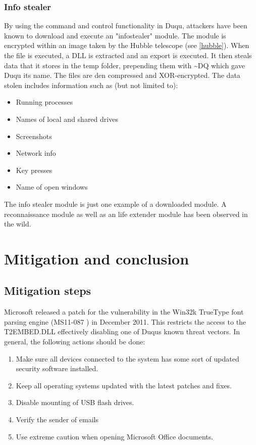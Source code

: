\documentclass[11pt,english,a4paper]{report}
\begin{document}
\subsection{Info stealer}
By using the command and control functionality in Duqu, attackers have been known to download and execute an "infostealer" module. The module is encrypted within an image taken by the Hubble telescope (see \ref{hubble}). When the file is executed, a DLL is extracted and an export is executed. It then steals data that it stores in the temp folder, prepending them with \textasciitilde DQ which gave Duqu its name.
The files are den compressed and XOR-encrypted. The data stolen includes information such as (but not limited to):
\begin{itemize}
  \item Running processes
  \item Names of local and shared drives
  \item Screenshots
  \item Network info
  \item Key presses
  \item Name of open windows
\end{itemize}
The info stealer module is just one example of a downloaded module. A reconnaissance module as well as an life extender module has been observed in the wild.

\chapter{Mitigation and conclusion}
\section{Mitigation steps}
Microsoft released a patch for the vulnerability in the Win32k TrueType font parsing engine (MS11-087 \cite{TT_MSB}) in  December 2011. This restricts the access to the T2EMBED.DLL effectively disabling one of Duqus known threat vectors. In general, the following actions should be done:
 \begin{enumerate}
   \item Make sure all devices connected to the system has some sort of updated security software installed.
   \item Keep all operating systems updated with the latest patches and fixes.
   \item Disable mounting of USB flash drives. 
   \item Verify the sender of emails
   \item Use extreme caution when opening Microsoft Office documents. 
  \end{enumerate}
\end{document}
